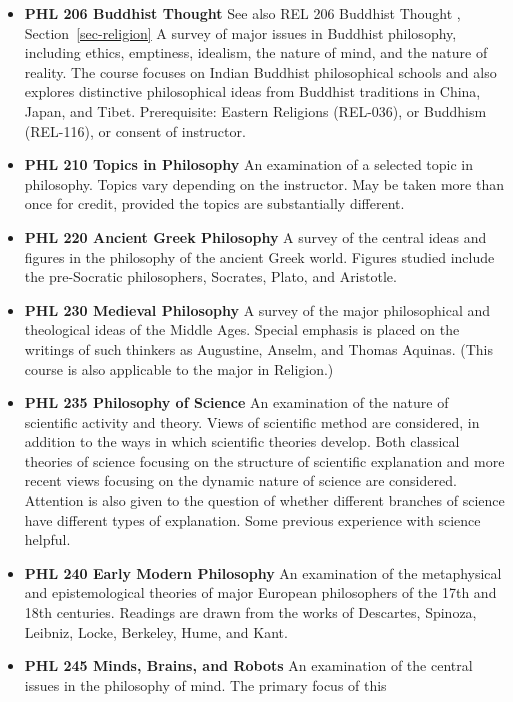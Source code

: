 \documentclass[
  letterpaper,
]{scrbook}
\providecommand{\tightlist}{%
  \setlength{\itemsep}{0pt}\setlength{\parskip}{0pt}}
\begin{document}
\begin{itemize}
\tightlist
\item
  \textbf{PHL 206 Buddhist Thought} See also REL 206 Buddhist Thought ,
  Section~\ref{sec-religion} A survey of major issues in Buddhist
  philosophy, including ethics, emptiness, idealism, the nature of mind,
  and the nature of reality. The course focuses on Indian Buddhist
  philosophical schools and also explores distinctive philosophical
  ideas from Buddhist traditions in China, Japan, and Tibet.
  Prerequisite: Eastern Religions (REL-036), or Buddhism (REL-116), or
  consent of instructor.\\
\item
  \textbf{PHL 210 Topics in Philosophy} An examination of a selected
  topic in philosophy. Topics vary depending on the instructor. May be
  taken more than once for credit, provided the topics are substantially
  different.
\item
  \textbf{PHL 220 Ancient Greek Philosophy} A survey of the central
  ideas and figures in the philosophy of the ancient Greek world.
  Figures studied include the pre-Socratic philosophers, Socrates,
  Plato, and Aristotle.
\item
  \textbf{PHL 230 Medieval Philosophy} A survey of the major
  philosophical and theological ideas of the Middle Ages. Special
  emphasis is placed on the writings of such thinkers as Augustine,
  Anselm, and Thomas Aquinas. (This course is also applicable to the
  major in Religion.)
\item
  \textbf{PHL 235 Philosophy of Science} An examination of the nature of
  scientific activity and theory. Views of scientific method are
  considered, in addition to the ways in which scientific theories
  develop. Both classical theories of science focusing on the structure
  of scientific explanation and more recent views focusing on the
  dynamic nature of science are considered. Attention is also given to
  the question of whether different branches of science have different
  types of explanation. Some previous experience with science helpful.
\item
  \textbf{PHL 240 Early Modern Philosophy} An examination of the
  metaphysical and epistemological theories of major European
  philosophers of the 17th and 18th centuries. Readings are drawn from
  the works of Descartes, Spinoza, Leibniz, Locke, Berkeley, Hume, and
  Kant.
\item
  \textbf{PHL 245 Minds, Brains, and Robots} An examination of the
  central issues in the philosophy of mind. The primary focus of this

\end{itemize}
\end{document}
